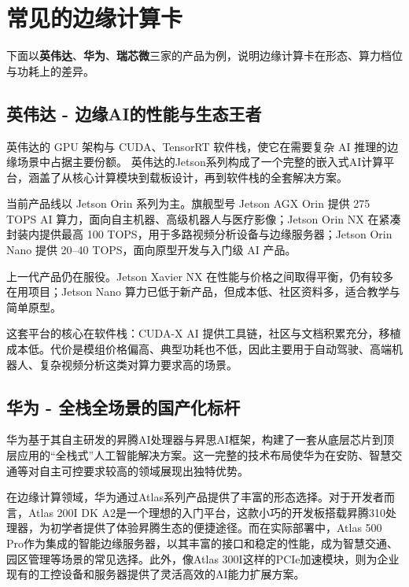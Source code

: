 \section{常见的边缘计算卡}\label{src-book-chapter1-h7}

下面以\textbf{英伟达}、\textbf{华为}、\textbf{瑞芯微}三家的产品为例，说明边缘计算卡在形态、算力档位与功耗上的差异。

\subsection{英伟达 - 边缘AI的性能与生态王者}\label{src-book-chapter1-h8}

英伟达的 GPU 架构与 CUDA、TensorRT 软件栈，使它在需要复杂 AI
推理的边缘场景中占据主要份额。
英伟达的Jetson系列构成了一个完整的嵌入式AI计算平台，涵盖了从核心计算模块到载板设计，再到软件栈的全套解决方案。

当前产品线以 Jetson Orin 系列为主。旗舰型号 Jetson AGX Orin 提供 275
TOPS AI 算力，面向自主机器、高级机器人与医疗影像；Jetson Orin NX
在紧凑封装内提供最高 100 TOPS，用于多路视频分析设备与边缘服务器；Jetson
Orin Nano 提供 20--40 TOPS，面向原型开发与入门级 AI 产品。

上一代产品仍在服役。Jetson Xavier NX
在性能与价格之间取得平衡，仍有较多在用项目；Jetson Nano
算力已低于新产品，但成本低、社区资料多，适合教学与简单原型。

这套平台的核心在软件栈：CUDA-X AI
提供工具链，社区与文档积累充分，移植成本低。代价是模组价格偏高、典型功耗也不低，因此主要用于自动驾驶、高端机器人、复杂视频分析这类对算力要求高的场景。

\subsection{华为 - 全栈全场景的国产化标杆}\label{src-book-chapter1-h9}

华为基于其自主研发的昇腾AI处理器与昇思AI框架，构建了一套从底层芯片到顶层应用的``全栈式''人工智能解决方案。这一完整的技术布局使华为在安防、智慧交通等对自主可控要求较高的领域展现出独特优势。

在边缘计算领域，华为通过Atlas系列产品提供了丰富的形态选择。对于开发者而言，Atlas
200I DK
A2是一个理想的入门平台，这款小巧的开发板搭载昇腾310处理器，为初学者提供了体验昇腾生态的便捷途径。而在实际部署中，Atlas
500
Pro作为集成的智能边缘服务器，以其丰富的接口和稳定的性能，成为智慧交通、园区管理等场景的常见选择。此外，像Atlas
300I这样的PCIe加速模块，则为企业现有的工控设备和服务器提供了灵活高效的AI能力扩展方案。

